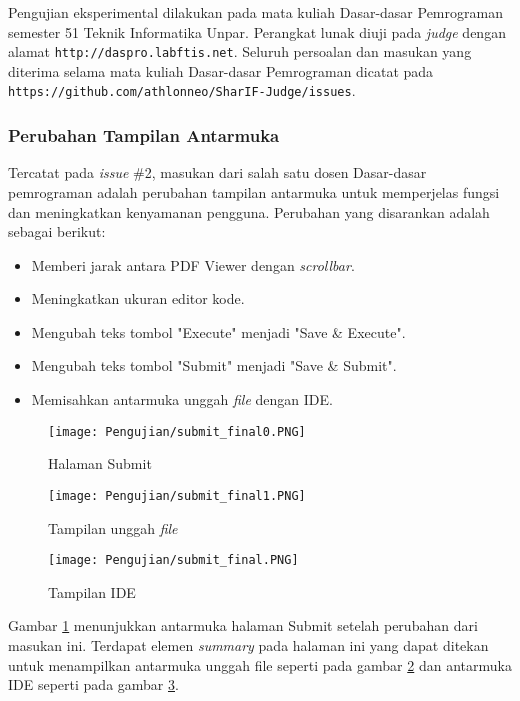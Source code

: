 Pengujian eksperimental dilakukan pada mata kuliah Dasar-dasar Pemrograman semester 51 Teknik Informatika Unpar. Perangkat lunak diuji pada \textit{judge} dengan alamat \verb|http://daspro.labftis.net|. Seluruh persoalan dan masukan yang diterima selama mata kuliah Dasar-dasar Pemrograman dicatat pada \verb|https://github.com/athlonneo/SharIF-Judge/issues|.

\subsubsection{Perubahan Tampilan Antarmuka}
Tercatat pada \textit{issue} \#2, masukan dari salah satu dosen Dasar-dasar pemrograman adalah perubahan tampilan antarmuka untuk memperjelas fungsi dan meningkatkan kenyamanan pengguna. Perubahan yang disarankan adalah sebagai berikut:
\begin{itemize}
    \item Memberi jarak antara PDF Viewer dengan \textit{scrollbar}.
    \item Meningkatkan ukuran editor kode.
    \item Mengubah teks tombol "Execute" menjadi "Save \& Execute".
    \item Mengubah teks tombol "Submit" menjadi "Save \& Submit".
    \item Memisahkan antarmuka unggah \textit{file} dengan IDE.
\end{itemize}

\begin{figure}[H]
	\centering  
	\texttt{[image: Pengujian/submit\_final0.PNG]}  
	\caption{Halaman Submit}
	\label{fig:5:submit0} 
\end{figure} 

\begin{figure}[H]
	\centering  
	\texttt{[image: Pengujian/submit\_final1.PNG]}  
	\caption{Tampilan unggah \textit{file}}
	\label{fig:5:submit1} 
\end{figure} 

\begin{figure}[H]
	\centering  
	\texttt{[image: Pengujian/submit\_final.PNG]}  
	\caption{Tampilan IDE}
	\label{fig:5:submit2} 
\end{figure} 

Gambar \ref{fig:5:submit0} menunjukkan antarmuka halaman Submit setelah perubahan dari masukan ini. Terdapat elemen \textit{summary} pada halaman ini yang dapat ditekan untuk menampilkan antarmuka unggah file seperti pada gambar \ref{fig:5:submit1} dan antarmuka IDE seperti pada gambar \ref{fig:5:submit2}.

